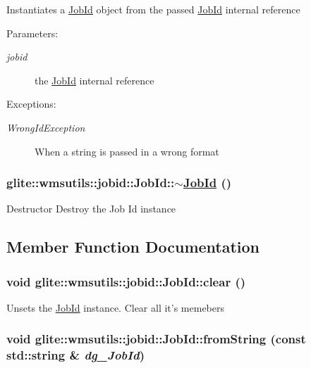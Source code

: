 Instantiates a \hyperlink{classglite_1_1wmsutils_1_1jobid_1_1JobId}{Job\-Id} object from the passed \hyperlink{classglite_1_1wmsutils_1_1jobid_1_1JobId}{Job\-Id} internal reference \begin{Desc}
\item[Parameters:]
\begin{description}
\item[{\em jobid}]the \hyperlink{classglite_1_1wmsutils_1_1jobid_1_1JobId}{Job\-Id} internal reference \end{description}
\end{Desc}
\begin{Desc}
\item[Exceptions:]
\begin{description}
\item[{\em Wrong\-Id\-Exception}]When a string is passed in a wrong format \end{description}
\end{Desc}
\hypertarget{classglite_1_1wmsutils_1_1jobid_1_1JobId_z1_4}{
\subsubsection[$\sim$JobId]{\setlength{\rightskip}{0pt plus 5cm}glite::wmsutils::jobid::Job\-Id::$\sim$\hyperlink{classglite_1_1wmsutils_1_1jobid_1_1JobId}{Job\-Id} ()}}
\label{classglite_1_1wmsutils_1_1jobid_1_1JobId_z1_4}


Destructor Destroy the Job Id instance 

\subsection{Member Function Documentation}
\hypertarget{classglite_1_1wmsutils_1_1jobid_1_1JobId_z3_0}{
\subsubsection[clear]{\setlength{\rightskip}{0pt plus 5cm}void glite::wmsutils::jobid::Job\-Id::clear ()}}
\label{classglite_1_1wmsutils_1_1jobid_1_1JobId_z3_0}


Unsets the \hyperlink{classglite_1_1wmsutils_1_1jobid_1_1JobId}{Job\-Id} instance. Clear all it's memebers \hypertarget{classglite_1_1wmsutils_1_1jobid_1_1JobId_a0}{
\subsubsection[fromString]{\setlength{\rightskip}{0pt plus 5cm}void glite::wmsutils::jobid::Job\-Id::from\-String (const std::string \& {\em dg\_\-Job\-Id})}}
\label{classglite_1_1wmsutils_1_1jobid_1_1JobId_a0}



